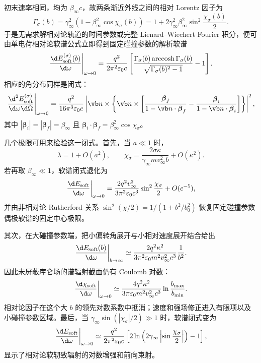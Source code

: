 初末速率相同，均为 $\beta_\infty c$，故两条渐近外线之间的相对 Lorentz 因子为
\begin{equation*}
	\Gamma_\sigma(b)
	=\gamma_\infty^2
	\left(1-\beta_\infty^2\cos\chi_\sigma(b)\right)
	=1+2\gamma_\infty^2\beta_\infty^2
	\sin^2\frac{\chi_\sigma(b)}{2}.
\end{equation*}
于是无需求解相对论轨道的时间参数或完整 Lienard--Wiechert Fourier 积分，便可由单电荷相对论软谱公式立即得到固定碰撞参数的解析软谱
\begin{equation*}
	\left.\frac{\d E_{\mathrm{soft}}^{(\sigma)}(b)}{\d\omega}\right|_{\omega\to0}
	=\frac{q^2}{2\pi^2\varepsilon_0c}
	\left[
	\frac{\Gamma_\sigma(b)\operatorname{arccosh}\Gamma_\sigma(b)}
	{\sqrt{\Gamma_\sigma(b)^2-1}}-1
	\right].
\end{equation*}
相应的角分布同样是闭式：
\begin{equation*}
	\left.\frac{\d^2E_{\mathrm{soft}}^{(\sigma)}}{\d\omega\d\Omega}\right|_{\omega\to0}
	=\frac{q^2}{16\pi^3\varepsilon_0c}
	\left|
	\vb n\times\left\{\vb n\times
	\left[
	\frac{\boldsymbol\beta_f}{1-\vb n\cdot\boldsymbol\beta_f}
	-\frac{\boldsymbol\beta_i}{1-\vb n\cdot\boldsymbol\beta_i}
	\right]\right\}
	\right|^2,
\end{equation*}
其中 $|\boldsymbol\beta_i|=|\boldsymbol\beta_f|=\beta_\infty$ 且 $\boldsymbol\beta_i\cdot\boldsymbol\beta_f=\beta_\infty^2\cos\chi_\sigma$。

几个极限可用来检验这一闭式。首先，当 $a\ll1$ 时，
\begin{equation*}
	\lambda=1+O(a^2),
	\qquad
	\chi_\sigma
	=\frac{2\sigma\kappa}{\gamma_\infty m v_\infty^2b}+O(\kappa^2).
\end{equation*}
若再取 $\beta_\infty\ll1$，软谱闭式退化为
\begin{equation*}
	\left.\frac{\d E_{\mathrm{soft}}}{\d\omega}\right|_{\omega\to0}
	=\frac{2q^2v_\infty^2}{3\pi^2\varepsilon_0c^3}
	\sin^2\frac{\chi_\sigma}{2}
	+O(c^{-5}),
\end{equation*}
并由非相对论 Rutherford 关系 $\sin^2(\chi/2)=1/(1+b^2/b_0^2)$ 恢复固定碰撞参数偶极软谱的固定中心极限。

其次，在大碰撞参数端，把小偏转角展开与小相对速度展开结合给出
\begin{equation*}
	\left.\frac{\d E_{\mathrm{soft}}(b)}{\d\omega}\right|_{b\to\infty}
	\simeq
	\frac{2q^2\kappa^2}{3\pi^2\varepsilon_0m^2v_\infty^2c^3}\frac{1}{b^2}.
\end{equation*}
因此未屏蔽库仑场的谱辐射截面仍有 Coulomb 对数：
\begin{equation*}
	\left.\frac{\d\chi_{\mathrm{soft}}}{\d\omega}\right|_{\omega\to0}
	\simeq
	\frac{4q^2\kappa^2}{3\pi\varepsilon_0m^2v_\infty^2c^3}
	\ln\frac{b_{\max}}{b_{\min}}.
\end{equation*}
相对论因子在这个大 $b$ 的领先对数系数中抵消；速度和强场修正进入有限项以及小碰撞参数区域。最后，当 $\gamma_\infty\sin(|\chi_\sigma|/2)\gg1$ 时，软谱闭式变为
\begin{equation*}
	\left.\frac{\d E_{\mathrm{soft}}}{\d\omega}\right|_{\omega\to0}
	\simeq
	\frac{q^2}{2\pi^2\varepsilon_0c}
	\left[
	2\ln\left(2\gamma_\infty\left|\sin\frac{\chi_\sigma}{2}\right|\right)-1
	\right],
\end{equation*}
显示了相对论软轫致辐射的对数增强和前向束射。

